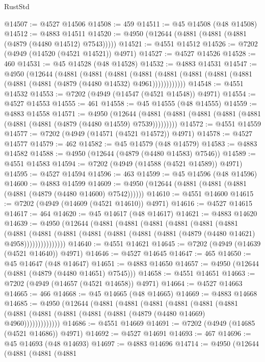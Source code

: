 \begin{lexlean}{RustStd}
\begin{coremodule}
@14507 := @4527 @14506
@14508 := 459
@14511 := @45 @14508 (@48 @14508)
@14512 := @4883 @14511
@14520 := @4950 (@12644 (@4881 (@4881 (@4881 (@4879 (@4480 @14512) @7543)))))
@14521 := @4551 @14512
@14526 := @7202 (@4949 (@14520 (@4521 @14521)) @4971)
@14527 := @4527 @14526
@14528 := 460
@14531 := @45 @14528 (@48 @14528)
@14532 := @4883 @14531
@14547 := @4950
    (@12644
      (@4881
        (@4881
          (@4881
            (@4881 (@4881 (@4881 (@4881 (@4881 (@4881 (@4881 (@4879 (@4480 @14532) @4961))))))))))))
@14548 := @4551 @14532
@14553 := @7202 (@4949 (@14547 (@4521 @14548)) @4971)
@14554 := @4527 @14553
@14555 := 461
@14558 := @45 @14555 (@48 @14555)
@14559 := @4883 @14558
@14571 := @4950
    (@12644 (@4881 (@4881 (@4881 (@4881 (@4881 (@4881 (@4881 (@4879 (@4480 @14559) @7539)))))))))
@14572 := @4551 @14559
@14577 := @7202 (@4949 (@14571 (@4521 @14572)) @4971)
@14578 := @4527 @14577
@14579 := 462
@14582 := @45 @14579 (@48 @14579)
@14583 := @4883 @14582
@14588 := @4950 (@12644 (@4879 (@4480 @14583) @7546))
@14589 := @4551 @14583
@14594 := @7202 (@4949 (@14588 (@4521 @14589)) @4971)
@14595 := @4527 @14594
@14596 := 463
@14599 := @45 @14596 (@48 @14596)
@14600 := @4883 @14599
@14609 := @4950 (@12644 (@4881 (@4881 (@4881 (@4881 (@4879 (@4480 @14600) @7542))))))
@14610 := @4551 @14600
@14615 := @7202 (@4949 (@14609 (@4521 @14610)) @4971)
@14616 := @4527 @14615
@14617 := 464
@14620 := @45 @14617 (@48 @14617)
@14621 := @4883 @14620
@14639 := @4950
    (@12644
      (@4881
        (@4881
          (@4881
            (@4881
              (@4881
                (@4881
                  (@4881
                    (@4881
                      (@4881 (@4881 (@4881 (@4881 (@4881 (@4879 (@4480 @14621) @4958)))))))))))))))
@14640 := @4551 @14621
@14645 := @7202 (@4949 (@14639 (@4521 @14640)) @4971)
@14646 := @4527 @14645
@14647 := 465
@14650 := @45 @14647 (@48 @14647)
@14651 := @4883 @14650
@14657 := @4950 (@12644 (@4881 (@4879 (@4480 @14651) @7545)))
@14658 := @4551 @14651
@14663 := @7202 (@4949 (@14657 (@4521 @14658)) @4971)
@14664 := @4527 @14663
@14665 := 466
@14668 := @45 @14665 (@48 @14665)
@14669 := @4883 @14668
@14685 := @4950
    (@12644
      (@4881
        (@4881
          (@4881
            (@4881
              (@4881
                (@4881 (@4881 (@4881 (@4881 (@4881 (@4881 (@4879 (@4480 @14669) @4960)))))))))))))
@14686 := @4551 @14669
@14691 := @7202 (@4949 (@14685 (@4521 @14686)) @4971)
@14692 := @4527 @14691
@14693 := 467
@14696 := @45 @14693 (@48 @14693)
@14697 := @4883 @14696
@14714 := @4950
    (@12644
      (@4881
        (@4881
          (@4881

\end{coremodule}
\end{lexlean}
